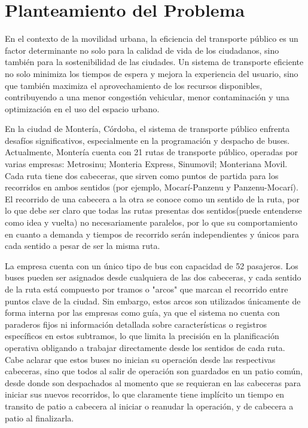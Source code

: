 \documentclass[preprint,11pt]{elsarticle}
\begin{document}
\section{Planteamiento del Problema}

En el contexto de la movilidad urbana, la eficiencia del transporte público es un factor determinante no solo para la calidad de vida de los ciudadanos, sino también para la sostenibilidad de las ciudades. Un sistema de transporte eficiente no solo minimiza los tiempos de espera y mejora la experiencia del usuario, sino que también maximiza el aprovechamiento de los recursos disponibles, contribuyendo a una menor congestión vehicular, menor contaminación y una optimización en el uso del espacio urbano.

En la ciudad de Montería, Córdoba, el sistema de transporte público enfrenta desafíos significativos, especialmente en la programación y despacho de buses. Actualmente, Montería cuenta con 21 rutas de transporte público, operadas por varias empresas: Metrosinu; Monteria Express, Sinumovil; Monteriana Movil. Cada ruta tiene dos cabeceras, que sirven como puntos de partida para los recorridos en ambos sentidos (por ejemplo, Mocarí-Panzenu y Panzenu-Mocarí). El recorrido de una cabecera a la otra se conoce como un sentido de la ruta, por lo que debe ser claro que todas las rutas presentas dos sentidos(puede entenderse como idea y vuelta) no necesariamente paralelos, por lo que su comportamiento en cuanto a demanda y tiempos de recorrido serán independientes y únicos para cada sentido a pesar de ser la misma ruta. 

La empresa cuenta con un único tipo de bus con capacidad de 52 pasajeros. Los buses pueden ser asignados desde cualquiera de las dos cabeceras, y cada sentido de la ruta está compuesto por tramos o "arcos" que marcan el recorrido entre puntos clave de la ciudad. Sin embargo, estos arcos son utilizados únicamente de forma interna por las empresas como guía, ya que el sistema no cuenta con paraderos fijos ni información detallada sobre características o registros específicos en estos subtramos, lo que limita la precisión en la planificación operativa obligando a trabajar directamente desde los sentidos de cada ruta. Cabe aclarar que estos buses no inician su operación desde las respectivas cabeceras, sino que todos al salir de operación son guardados en un patio común, desde donde son despachados al momento que se requieran en las cabeceras para iniciar sus nuevos recorridos, lo que claramente tiene implícito un tiempo en transito de patio a cabecera al iniciar o reanudar la operación, y de cabecera a patio al finalizarla.
\end{document}
